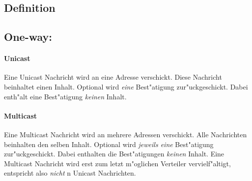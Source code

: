 \pagebreak

\subsection{Definition}
\label{subsec:mep-def}

\subsection*{One-way:}

\paragraph{Unicast}
Eine Unicast Nachricht wird an eine Adresse verschickt. Diese Nachricht beinhaltet einen Inhalt. Optional wird {\it eine} Best"atigung zur"uckgeschickt. Dabei enth"alt eine Best"atigung \emph{keinen} Inhalt.
\paragraph{Multicast}
Eine Multicast Nachricht wird an mehrere Adressen verschickt. Alle Nachrichten beinhalten den selben Inhalt. Optional wird {\it jeweils eine} Best"atigung zur"uckgeschickt. Dabei enthalten die Best"atigungen \emph{keinen} Inhalt. Eine Multicast Nachricht wird erst zum letzt m"oglichen Verteiler vervielf"altigt, entspricht also \emph{nicht} n Unicast Nachrichten.

